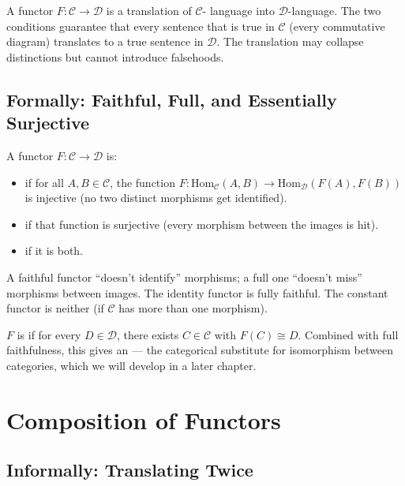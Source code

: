 A functor $F : \mathcal{C} \to \mathcal{D}$ is a translation of $\mathcal{C}$-
language into $\mathcal{D}$-language. The two conditions guarantee that every
sentence that is true in $\mathcal{C}$ (every commutative diagram) translates
to a true sentence in $\mathcal{D}$. The translation may collapse distinctions
but cannot introduce falsehoods.

\subsection{Formally: Faithful, Full, and Essentially Surjective}

A functor $F : \mathcal{C} \to \mathcal{D}$ is:
\begin{itemize}
  \item {} if for all $A, B \in \mathcal{C}$, the function
        $F : \mathrm{Hom}_\mathcal{C}(A,B) \to \mathrm{Hom}_\mathcal{D}(F(A),F(B))$
        is injective (no two distinct morphisms get identified).
  \item {} if that function is surjective (every morphism between
        the images is hit).
  \item {} if it is both.
\end{itemize}

A faithful functor ``doesn't identify'' morphisms; a full one ``doesn't miss''
morphisms between images. The identity functor is fully faithful. The constant
functor is neither (if $\mathcal{C}$ has more than one morphism).

$F$ is  if for every $D \in \mathcal{D}$, there
exists $C \in \mathcal{C}$ with $F(C) \cong D$. Combined with full
faithfulness, this gives an  --- the
categorical substitute for isomorphism between categories, which we will
develop in a later chapter.


\section{Composition of Functors}
\label{sec:functor-composition}

\subsection{Informally: Translating Twice}

